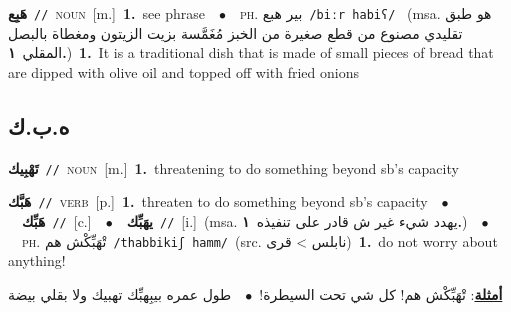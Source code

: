 \documentclass[10pt,a4paper,twoside]{article} %
\begin{document}
\begin{multicols}{2}
{\setlength\topsep{0pt}\textbf{\foreignlanguage{arabic}{هَبِع}}\ {\color{gray}\texttt{//}\color{black}}\ \textsc{noun}\ [m.]\ \textbf{1.}~see phrase\ \ $\bullet$\ \ \textsc{ph.} \color{gray} \foreignlanguage{arabic}{بير هبع}\color{black}\ {\color{gray}\texttt{/{\sffamily biːr habiʕ}/}\color{black}}\ \color{gray} (msa. \foreignlanguage{arabic}{هو طبق تقليدي مصنوع من قطع صغيرة من الخبز مُغَمَّسة بزيت الزيتون ومغطاة بالبصل المقلي}~\foreignlanguage{arabic}{\textbf{١.}})\color{black}\ \textbf{1.}~It is a traditional dish that is made of small pieces of bread that are dipped with olive oil and topped off with fried onions\ } \vspace{2mm}

\vspace{-3mm}
\subsection*{\color{blue}\foreignlanguage{arabic}{ه.ب.ك}\color{blue}{}} 

{\setlength\topsep{0pt}\textbf{\foreignlanguage{arabic}{تَهْبِيك}}\ {\color{gray}\texttt{//}\color{black}}\ \textsc{noun}\ [m.]\ \textbf{1.}~threatening to do something beyond sb's capacity\ } \vspace{2mm}

{\setlength\topsep{0pt}\textbf{\foreignlanguage{arabic}{هَبَّك}}\ {\color{gray}\texttt{//}\color{black}}\ \textsc{verb}\ [p.]\ \textbf{1.}~threaten to do something beyond sb's capacity\ \ $\bullet$\ \ \setlength\topsep{0pt}\textbf{\foreignlanguage{arabic}{هَبِّك}}\ {\color{gray}\texttt{//}\color{black}}\ [c.]\ \ $\bullet$\ \ \setlength\topsep{0pt}\textbf{\foreignlanguage{arabic}{يهَبِّك}}\ {\color{gray}\texttt{//}\color{black}}\ [i.]\ \color{gray}(msa. \foreignlanguage{arabic}{يهدد شيء غير ش قادر على تنفيذه}~\foreignlanguage{arabic}{\textbf{١.}})\color{black}\ \ $\bullet$\ \ \textsc{ph.} \color{gray} \foreignlanguage{arabic}{تْهَبِّكْش هم}\color{black}\ {\color{gray}\texttt{/{\sffamily thabbikiʃ hamm}/}\color{black}}\ \color{gray}(src. \foreignlanguage{arabic}{نابلس > قرى})\color{black}\ \textbf{1.}~do not worry about anything!\  \begin{flushright}\color{gray}\foreignlanguage{arabic}{\textbf{\underline{\foreignlanguage{arabic}{أمثلة}}}: تْهَبِّكْش هم! كل شي تحت السيطرة!\ $\bullet$\ \  طول عمره بيبِهبِّك تهبيك ولا بقلي بيضة}\end{flushright}\color{black}} \vspace{2mm}


\end{multicols}
\end{document}
